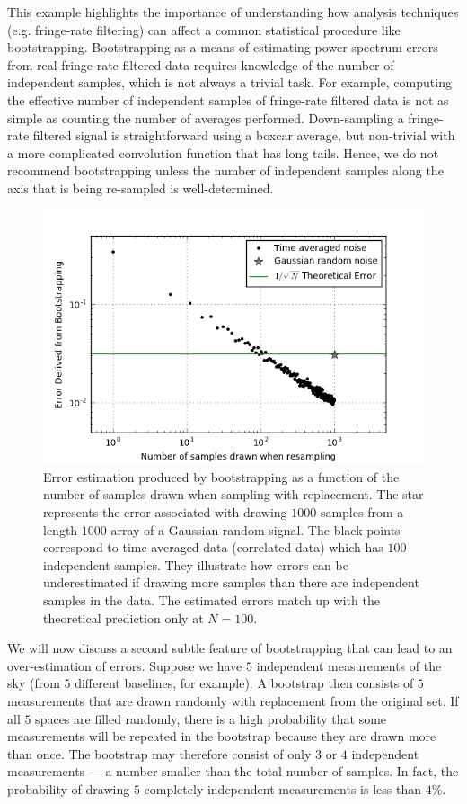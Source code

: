 \documentclass[preprint2,numberedappendix,tighten]{aastex6}  %
\begin{document}
This example highlights the importance of understanding how analysis techniques (e.g. fringe-rate filtering) can affect a common statistical procedure like bootstrapping. Bootstrapping as a means of estimating power spectrum errors from real fringe-rate filtered data requires knowledge of the number of independent samples, which is not always a trivial task. For example, computing the effective number of independent samples of fringe-rate filtered data is not as simple as counting the number of averages performed. Down-sampling a fringe-rate filtered signal is straightforward using a boxcar average, but non-trivial with a more complicated convolution function that has long tails. Hence, we do not recommend bootstrapping unless the number of independent samples along the axis that is being re-sampled is well-determined.

\begin{figure}
	\centering
	\includegraphics[trim={0.3cm 0.3cm 0.3cm 0.3cm},width=\columnwidth]{plots/toy_error1.png}
	\caption{Error estimation produced by bootstrapping as a function of the number of samples drawn when sampling with replacement. The star represents the error associated with drawing $1000$ samples from a length $1000$ array of a Gaussian random signal. The black points correspond to time-averaged data (correlated data) which has $100$ independent samples. They illustrate how errors can be underestimated if drawing more samples than there are independent samples in the data. The estimated errors match up with the theoretical prediction only at $N=100$.}
	\label{fig:toy_error1}
\end{figure}

We will now discuss a second subtle feature of bootstrapping that can lead to an over-estimation of errors. Suppose we have $5$ independent measurements of the sky (from $5$ different baselines, for example). A bootstrap then consists of $5$ measurements that are drawn randomly with replacement from the original set. If all $5$ spaces are filled randomly, there is a high probability that some measurements will be repeated in the bootstrap because they are drawn more than once. The bootstrap may therefore consist of only $3$ or $4$ independent measurements --- a number smaller than the total number of samples.  In fact, the probability of drawing $5$ completely independent measurements is less than $4\%$.
\end{document}

